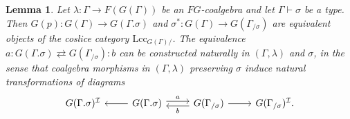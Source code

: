 \documentclass[a4paper]{article}
\newtheorem{lemma}[theorem]{Lemma}
\theoremstyle{remark}
\theoremstyle{definition}
\begin{document}
\begin{lemma}
  \label{lem:extension-vs-slice}
  Let $\lambda : \Gamma \rightarrow F(G(\Gamma))$ be an $FG$-coalgebra and let $\Gamma \vdash \sigma$ be a type.
  Then $G(p) : G(\Gamma) \rightarrow G(\Gamma.\sigma)$ and $\sigma^* : G(\Gamma) \rightarrow G(\Gamma_{/ \sigma})$ are equivalent objects of the coslice category $\mathrm{Lcc}_{G(\Gamma) /}$.
  The equivalence $a : G(\Gamma.\sigma) \rightleftarrows G(\Gamma_{/ \sigma}) : b$ can be constructed naturally in $(\Gamma, \lambda)$ and $\sigma$, in the sense that coalgebra morphisms in $(\Gamma, \lambda)$ preserving $\sigma$ induce natural transformations of diagrams
  \begin{equation}
    \label{eq:ext-equivalence}
    \begin{tikzcd}
      G(\Gamma.\sigma)^\mathcal{I} & G(\Gamma.\sigma) \arrow[r, shift left, "a"] \arrow[l] & G(\Gamma_{/ \sigma}) \arrow[l, shift left, "b"] \arrow[r] & G(\Gamma_{/ \sigma})^\mathcal{I}.
    \end{tikzcd}
  \end{equation}
\end{lemma}
\end{document}

